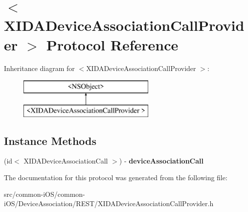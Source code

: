 \hypertarget{protocol_x_i_d_a_device_association_call_provider_01-p}{}\section{$<$X\+I\+D\+A\+Device\+Association\+Call\+Provider $>$ Protocol Reference}
\label{protocol_x_i_d_a_device_association_call_provider_01-p}
Inheritance diagram for $<$X\+I\+D\+A\+Device\+Association\+Call\+Provider $>$\+:\begin{figure}[H]
\begin{center}
\leavevmode
\includegraphics[height=2.000000cm]{protocol_x_i_d_a_device_association_call_provider_01-p}
\end{center}
\end{figure}
\subsection*{Instance Methods}
\begin{DoxyCompactItemize}
\item 
\hypertarget{protocol_x_i_d_a_device_association_call_provider_01-p_a706bf35dd2704378a77d1fe300e90214}{}\label{protocol_x_i_d_a_device_association_call_provider_01-p_a706bf35dd2704378a77d1fe300e90214} 
(id$<$ X\+I\+D\+A\+Device\+Association\+Call $>$) -\/ {\bfseries device\+Association\+Call}
\end{DoxyCompactItemize}


The documentation for this protocol was generated from the following file\+:\begin{DoxyCompactItemize}
\item 
src/common-\/i\+O\+S/common-\/i\+O\+S/\+Device\+Association/\+R\+E\+S\+T/X\+I\+D\+A\+Device\+Association\+Call\+Provider.\+h\end{DoxyCompactItemize}
